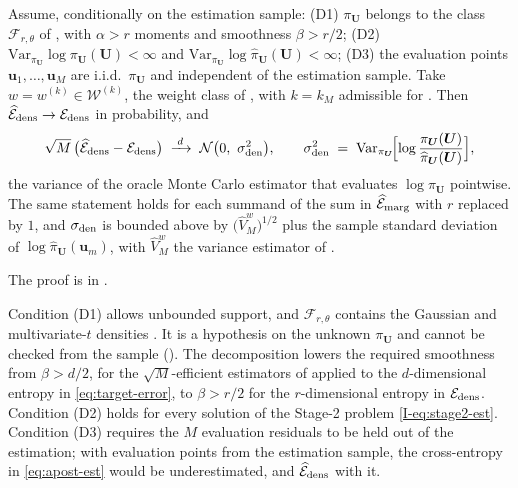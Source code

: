 \documentclass[review,hidelinks,onefignum,onetabnum]{siamart251216}
\newcommand{\Var}{\mathrm{Var}}
\newcommand{\vu}{\bm{u}}
\newcommand{\vU}{\bm{U}}
\begin{document}
\begin{corollary}
\label{cor:apost-den}
Assume, conditionally on the estimation sample: \textup{(D1)} $\pi_{\vU}$ belongs to the class $\mathcal F_{r,\theta}$ of \cite[\S2]{BerrettSamworthYuan2019}, with $\alpha > r$ moments and smoothness $\beta > r/2$; \textup{(D2)} $\Var_{\pi_{\vU}}\log\pi_{\vU}(\vU) < \infty$ and $\Var_{\pi_{\vU}}\log\widehat\pi_{\vU}(\vU) < \infty$; \textup{(D3)} the evaluation points $\vu_1,\dots,\vu_M$ are i.i.d.\ $\pi_{\vU}$ and independent of the estimation sample. Take $w = w^{(k)}\in\mathcal W^{(k)}$, the weight class of \cite[eq.~(2)]{BerrettSamworthYuan2019}, with $k = k_M$ admissible for \cite[Thm.~1]{BerrettSamworthYuan2019}. Then $\widehat{\mathcal E}_{\rm dens}\to\mathcal E_{\rm dens}$ in probability, and
\begin{equation}
  \sqrt M\,\bigl(\widehat{\mathcal E}_{\rm dens} - \mathcal E_{\rm dens}\bigr)
  \;\xrightarrow{\;d\;}\;
  \mathcal N\bigl(0,\ \sigma_{\rm den}^2\bigr),
  \qquad
  \sigma_{\rm den}^2 \;=\; \Var_{\pi_{\vU}}\!\Bigl[\log\frac{\pi_{\vU}(\vU)}{\widehat\pi_{\vU}(\vU)}\Bigr],
  \label{eq:apost-clt}
\end{equation}
the variance of the oracle Monte Carlo estimator that evaluates $\log\pi_{\vU}$ pointwise. The same statement holds for each summand of the sum in $\widehat{\mathcal E}_{\rm marg}$ with $r$ replaced by $1$, and $\sigma_{\rm den}$ is bounded above by $\bigl(\widehat V^{w}_M\bigr)^{1/2}$ plus the sample standard deviation of $\log\widehat\pi_{\vU}(\vu_m)$, with $\widehat V^{w}_M$ the variance estimator of \cite[\S2]{BerrettSamworthYuan2019}.
\end{corollary}

The proof is in .

Condition \textup{(D1)} allows unbounded support, and $\mathcal F_{r,\theta}$ contains the Gaussian and multivariate-$t$ densities \cite[Prop.~5]{BerrettSamworthYuan2019}. It is a hypothesis on the unknown $\pi_{\vU}$ and cannot be checked from the sample (). The decomposition lowers the required smoothness from $\beta > d/2$, for the $\sqrt M$-efficient estimators of \cite{BerrettSamworthYuan2019} applied to the $d$-dimensional entropy in \eqref{eq:target-error}, to $\beta > r/2$ for the $r$-dimensional entropy in $\mathcal E_{\rm dens}$. Condition \textup{(D2)} holds for every solution of the Stage-2 problem \eqref{I-eq:stage2-est}. Condition \textup{(D3)} requires the $M$ evaluation residuals to be held out of the estimation; with evaluation points from the estimation sample, the cross-entropy in \eqref{eq:apost-est} would be underestimated, and $\widehat{\mathcal E}_{\rm dens}$ with it.
\end{document}
